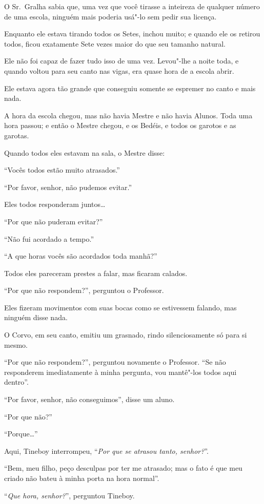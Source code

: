 O Sr.~Gralha sabia que, uma vez que você tirasse a inteireza de qualquer
número de uma escola, ninguém mais poderia usá"-lo sem pedir sua licença.

Enquanto ele estava tirando todos os Setes, inchou muito; e quando ele
os retirou todos, ficou exatamente Sete vezes maior do que seu
tamanho natural.

Ele não foi capaz de fazer tudo isso de uma vez. Levou"-lhe a noite toda,
e quando voltou para seu canto nas vigas, era quase hora de a escola
abrir.

Ele estava agora tão grande que conseguiu somente se espremer no canto e
mais nada.

A hora da escola chegou, mas não havia Mestre e não havia Alunos. Toda
uma hora passou; e então o Mestre chegou, e os Bedéis, e todos os
garotos e as garotas.

Quando todos eles estavam na sala, o Mestre disse:

``Vocês todos estão muito atrasados.''

``Por favor, senhor, não pudemos evitar.''

Eles todos responderam juntos…

``Por que não puderam evitar?''

``Não fui acordado a tempo.''

``A que horas vocês são acordados toda manhã?''

Todos eles pareceram prestes a falar, mas ficaram calados.

``Por que não respondem?'', perguntou o Professor.

Eles fizeram movimentos com suas bocas como se estivessem falando, mas ninguém
disse nada.

O Corvo, em seu canto, emitiu um grasnado, rindo silenciosamente só para
si mesmo.

``Por que não respondem?'', perguntou novamente o Professor. ``Se não
responderem imediatamente à minha pergunta, vou mantê"-los todos aqui
dentro''.

``Por favor, senhor, não conseguimos'', disse um aluno.

``Por que não?''

``Porque…''

Aqui, Tineboy interrompeu, ``\emph{Por que se atrasou tanto, senhor?}''.

``Bem, meu filho, peço desculpas por ter me atrasado; mas o fato é que
meu criado não bateu à minha porta na hora normal''.

``\emph{Que hora, senhor?}'', perguntou Tineboy.

